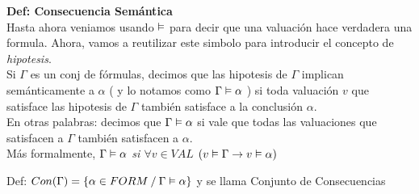 \documentclass[14pt,a4paper,fleqn]{article}
\begin{document}
\textbf{Def: Consecuencia Semántica} \\
Hasta ahora veniamos usando $\vDash$ para decir que una valuación hace verdadera una formula. Ahora, vamos a reutilizar este simbolo para introducir el concepto de \emph{hipotesis}.\\
Si $\Gamma$ es un conj de fórmulas, decimos que las hipotesis de $\Gamma$ implican semánticamente a $\alpha$ ( y lo notamos como $\Gamma \vDash \alpha$ ) si toda valuación $v$ que satisface las hipotesis de $\Gamma$ también satisface a la conclusión $\alpha$. \\
En otras palabras: decimos que $\Gamma \vDash \alpha$ si vale que todas las valuaciones que satisfacen a $\Gamma$ también satisfacen a $\alpha$.\\
Más formalmente, \emph{$\Gamma \vDash \alpha$ si $\forall v \in VAL$ $(v \vDash \Gamma \rightarrow v \vDash \alpha)$}

Def: $Con(\Gamma) = \{ \alpha \in FORM \: / \: \Gamma \vDash \alpha \}$ y se llama Conjunto de Consecuencias 
\end{document}
